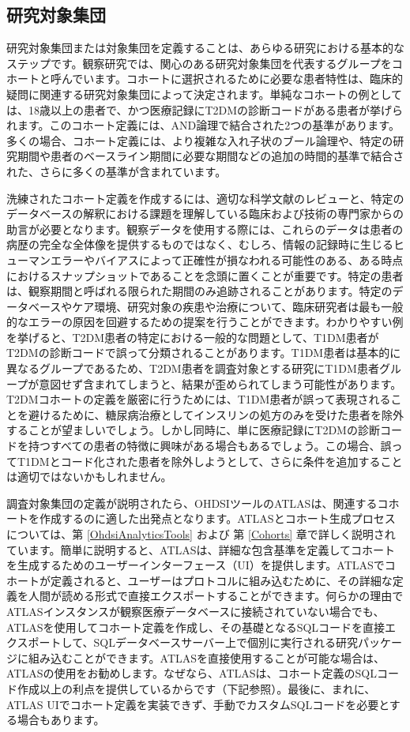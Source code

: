 \documentclass[
  11pt]{book}
\theoremstyle{definition}
\theoremstyle{definition}
\theoremstyle{definition}
\theoremstyle{definition}
\theoremstyle{remark}
\begin{document}
\subsection{研究対象集団}\label{ux7814ux7a76ux5bfeux8c61ux96c6ux56e3}

研究対象集団または対象集団を定義することは、あらゆる研究における基本的なステップです。観察研究では、関心のある研究対象集団を代表するグループをコホートと呼んでいます。コホートに選択されるために必要な患者特性は、臨床的疑問に関連する研究対象集団によって決定されます。単純なコホートの例としては、18歳以上の患者で、かつ医療記録にT2DMの診断コードがある患者が挙げられます。このコホート定義には、AND論理で結合された2つの基準があります。多くの場合、コホート定義には、より複雑な入れ子状のブール論理や、特定の研究期間や患者のベースライン期間に必要な期間などの追加の時間的基準で結合された、さらに多くの基準が含まれています。

洗練されたコホート定義を作成するには、適切な科学文献のレビューと、特定のデータベースの解釈における課題を理解している臨床および技術の専門家からの助言が必要となります。観察データを使用する際には、これらのデータは患者の病歴の完全な全体像を提供するものではなく、むしろ、情報の記録時に生じるヒューマンエラーやバイアスによって正確性が損なわれる可能性のある、ある時点におけるスナップショットであることを念頭に置くことが重要です。特定の患者は、観察期間と呼ばれる限られた期間のみ追跡されることがあります。特定のデータベースやケア環境、研究対象の疾患や治療について、臨床研究者は最も一般的なエラーの原因を回避するための提案を行うことができます。わかりやすい例を挙げると、T2DM患者の特定における一般的な問題として、T1DM患者がT2DMの診断コードで誤って分類されることがあります。T1DM患者は基本的に異なるグループであるため、T2DM患者を調査対象とする研究にT1DM患者グループが意図せず含まれてしまうと、結果が歪められてしまう可能性があります。T2DMコホートの定義を厳密に行うためには、T1DM患者が誤って表現されることを避けるために、糖尿病治療としてインスリンの処方のみを受けた患者を除外することが望ましいでしょう。しかし同時に、単に医療記録にT2DMの診断コードを持つすべての患者の特徴に興味がある場合もあるでしょう。この場合、誤ってT1DMとコード化された患者を除外しようとして、さらに条件を追加することは適切ではないかもしれません。

調査対象集団の定義が説明されたら、OHDSIツールのATLASは、関連するコホートを作成するのに適した出発点となります。ATLASとコホート生成プロセスについては、第 \ref{OhdsiAnalyticsTools} および 第 \ref{Cohorts} 章で詳しく説明されています。簡単に説明すると、ATLASは、詳細な包含基準を定義してコホートを生成するためのユーザーインターフェース（UI）を提供します。ATLASでコホートが定義されると、ユーザーはプロトコルに組み込むために、その詳細な定義を人間が読める形式で直接エクスポートすることができます。何らかの理由でATLASインスタンスが観察医療データベースに接続されていない場合でも、ATLASを使用してコホート定義を作成し、その基礎となるSQLコードを直接エクスポートして、SQLデータベースサーバー上で個別に実行される研究パッケージに組み込むことができます。ATLASを直接使用することが可能な場合は、ATLASの使用をお勧めします。なぜなら、ATLASは、コホート定義のSQLコード作成以上の利点を提供しているからです（下記参照）。最後に、まれに、ATLAS UIでコホート定義を実装できず、手動でカスタムSQLコードを必要とする場合もあります。
\end{document}
